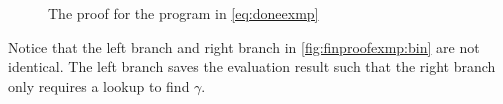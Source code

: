 \begin{exmp}
\begin{figure}[ht]
\begin{mdframed}[style=bigbox]
\begin{subfigure}[b]{1\textwidth}
\begin{prooftree}
				\end{prooftree}
				\caption{}
				\label{fig:finproofexmp:bin}
			\end{subfigure}
			\begin{subfigure}[b]{1\textwidth}
				\vspace*{0.49cm}
				\begin{prooftree}
				\end{prooftree}
				\caption{}
				\label{fig:finproofexmp:all}
			\end{subfigure}
		\end{mdframed}
		\caption{The proof for the program in \autoref{eq:doneexmp}}
		\label{fig:finproofexmp}
	\end{figure}
	Notice that the left branch and right branch in \autoref{fig:finproofexmp:bin} are not identical.
	The left branch saves the evaluation result such that the right branch only requires a lookup to find $\gamma$.
\end{exmp}


